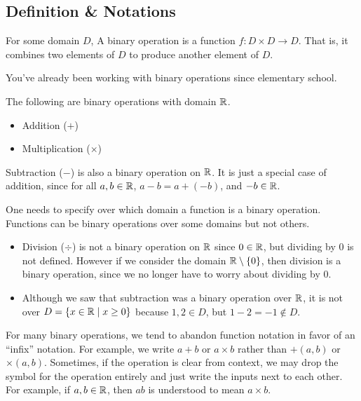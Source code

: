 \subsection{Definition \& Notations}
\begin{definition}
	For some domain $D$, A binary operation is a function $f: D \times D \to D$.
	That is, it combines two elements of $D$ to produce another element of $D$.
\end{definition}

You've already been working with binary operations since elementary school.
\begin{example}
	The following are binary operations with domain $\mathbb{R}$.
	\begin{itemize}
		\item Addition ($+$)
		\item Multiplication ($\times$)
	\end{itemize}

	Subtraction ($-$) is also a binary operation on $\mathbb{R}$.
	It is just a special case of addition, since for all $a,b \in \mathbb{R}$, $a - b = a + (-b)$, and $-b \in \mathbb{R}$.
\end{example}

One needs to specify over which domain a function is a binary operation.
Functions can be binary operations over some domains but not others.
\begin{example}
	\hspace{1pt}
	\begin{itemize}
		\item
		Division ($\div$) is not a binary operation on $\mathbb{R}$ since $0 \in \mathbb{R}$, but dividing by 0 is not defined.
		However if we consider the domain $\mathbb{R} \setminus \{0\}$, then division is a binary operation, since we no longer have to worry about dividing by 0.
		\item
		Although we saw that subtraction was a binary operation over $\mathbb{R}$, it is not over $D = \{x \in \mathbb{R} \mid x \geq 0\}$ because $1,2 \in D$, but $1 - 2 = -1 \not\in D$.
	\end{itemize}
\end{example}

For many binary operations, we tend to abandon function notation in favor of an ``infix'' notation.
For example, we write $a + b$ or $a \times b$ rather than $+(a,b)$ or $\times(a,b)$.
Sometimes, if the operation is clear from context, we may drop the symbol for the operation entirely and just write the inputs next to each other.
For example, if $a,b \in \mathbb{R}$, then $ab$ is understood to mean $a \times b$.